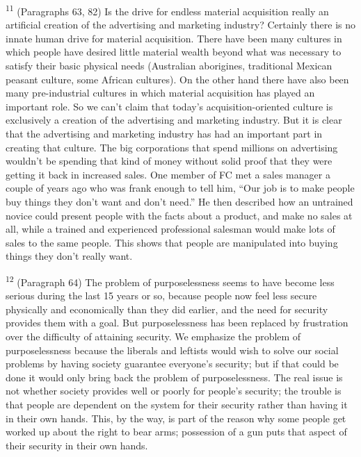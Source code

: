 \documentclass{article}
\begin{document}
\textsuperscript{11} (Paragraphs 63, 82) Is the drive for endless material acquisition really an artificial creation of 
the advertising and marketing industry? Certainly there is no innate human drive for material 
acquisition.  There have been many cultures in which people have desired little material wealth 
beyond what was necessary to satisfy their basic physical needs (Australian aborigines, 
traditional Mexican peasant culture, some African cultures).  On the other hand there have also 
been many pre-industrial cultures in which material acquisition has played an important role.  So 
we can’t claim that today’s acquisition-oriented culture is exclusively a creation of the 
advertising and marketing industry.  But it is clear that the advertising and marketing industry 
has had an important part in creating that culture.  The big corporations that spend millions on 
advertising wouldn’t be spending that kind of money without solid proof that they were getting it 
back in increased sales.  One member of FC met a sales manager a couple of years ago who was 
frank enough to tell him, “Our job is to make people buy things they don’t want and don’t need.” 
He then described how an untrained novice could present people with the facts about a product, 
and make no sales at all, while a trained and experienced professional salesman would make lots 
of sales to the same people.  This shows that people are manipulated into buying things they 
don’t really want. \vspace{\baselineskip}

\textsuperscript{12} (Paragraph 64) The problem of purposelessness seems to have become less serious during the 
last 15 years or so, because people now feel less secure physically and economically than they 
did earlier, and the need for security provides them with a goal.  But purposelessness has been 
replaced by frustration over the difficulty of attaining security.  We emphasize the problem of 
purposelessness because the liberals and leftists would wish to solve our social problems by 
having society guarantee everyone’s security; but if that could be done it would only bring back 
the problem of purposelessness.  The real issue is not whether society provides well or poorly for 
people’s security; the trouble is that people are dependent on the system for their security rather 
than having it in their own hands.  This, by the way, is part of the reason why some people get 
worked up about the right to bear arms; possession of a gun puts that aspect of their security in 
their own hands. \vspace{\baselineskip} \newpage
\end{document}

